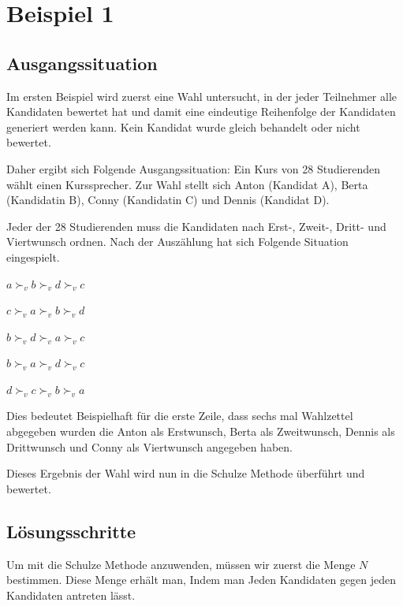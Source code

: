 \section{Beispiel 1}
\label{sec:beispiel1}


\subsection{Ausgangssituation} 
\label{sec:ausgangssituation1}
Im ersten Beispiel wird zuerst eine Wahl untersucht, in der jeder Teilnehmer alle Kandidaten bewertet hat und damit eine eindeutige Reihenfolge der Kandidaten generiert werden kann. Kein Kandidat wurde gleich behandelt oder nicht bewertet.

Daher ergibt sich Folgende Ausgangssituation:
Ein Kurs von 28 Studierenden wählt einen Kurssprecher. Zur Wahl stellt sich Anton (Kandidat A), Berta (Kandidatin B), Conny (Kandidatin C) und Dennis (Kandidat D).

Jeder der 28 Studierenden muss die Kandidaten nach Erst-, Zweit-, Dritt- und Viertwunsch ordnen. Nach der Auszählung hat sich Folgende Situation eingespielt. 

\begin{description}
\centering
\item[6 mal] $a \succ_{v} b \succ_{v} d \succ_{v}c$
\item[4 mal] $c \succ_{v} a \succ_{v} b \succ_{v}d$
\item[10 mal] $b \succ_{v} d \succ_{v} a \succ_{v}c$
\item[3 mal] $b \succ_{v} a \succ_{v} d \succ_{v}c$
\item[5 mal] $d \succ_{v} c \succ_{v} b \succ_{v}a$
\end{description}

Dies bedeutet Beispielhaft für die erste Zeile, dass sechs mal Wahlzettel abgegeben wurden die Anton als Erstwunsch, Berta als Zweitwunsch, Dennis als Drittwunsch und Conny als Viertwunsch angegeben haben.

Dieses Ergebnis der Wahl wird nun in die Schulze Methode überführt und bewertet.

\subsection{Lösungsschritte} 
\label{sec:loesungen1}
Um mit die Schulze Methode anzuwenden, müssen wir zuerst die Menge $N$ bestimmen. Diese Menge erhält man, Indem man Jeden Kandidaten gegen jeden Kandidaten antreten lässt.

